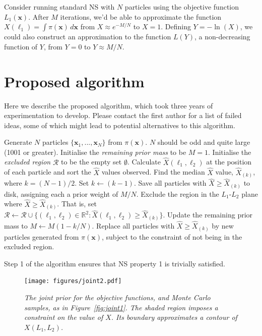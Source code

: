 \documentclass[journal,article,accept,moreauthors,pdftex,12pt,a4paper]{mdpi}
\newcommand{\xx}{\boldsymbol{x}}
\begin{document}
Consider running standard NS with $N$ particles
using the objective function $L_1(\xx)$.
After $M$ iterations, we'd be able to approximate
the function $X(\ell_1) = \int \pi(\xx) \, d\xx$
from $X\approx e^{-M/N}$ to $X=1$. Defining $Y=-\ln(X)$, we could also
construct an approximation to the function
$L(Y)$, a non-decreasing function of $Y$, from $Y=0$ to $Y\approx M/N$.

\section{Proposed algorithm}\label{sec:algorithm}

Here we describe the proposed algorithm, which took three years of
experimentation to develop. Please contact the first author for a list of
failed ideas, some of which might lead to potential alternatives to this
algorithm. 

\begin{algorithm}
\begin{algorithmic}
\State Generate $N$ particles $\{\xx_1, ..., \xx_N\}$ from $\pi(\xx)$.
$N$ should be odd and quite large (1001 or greater).
\State Initialise the {\em remaining prior mass} to be $M=1$.
\State Initialise the {\em excluded region} $\mathcal{R}$ to be the empty set
$\emptyset$.
	\State Calculate $\hat{X}(\ell_1, \ell_2)$ at the position of each particle
			and sort the $\hat{X}$ values observed.
	\State Find the median $\hat{X}$ value, $\hat{X}_{(k)}$, where $k = (N-1)/2$.
		\State Set $k \leftarrow (k-1)$.
	\EndWhile
	\State Save all particles with $\hat{X} \geq \hat{X}_{(k)}$ to disk,
			assigning each a prior weight of $M/N$.
	\State Exclude the region in the $L_1$-$L_2$ plane where
$\hat{X} \geq \hat{X}_{(k)}$. That is, set
	\State \hspace{20pt} $\mathcal{R} \leftarrow \mathcal{R} \cup \{(\ell_1, \ell_2) \in \mathbb{R}^2: \hat{X}(\ell_1, \ell_2) \geq \hat{X}_{(k)}\}$.
	\State Update the remaining prior mass to $M \leftarrow M(1 - k/N)$.
	\State Replace all particles with $\hat{X} \geq \hat{X}_{(k)}$ by new
			particles generated from $\pi(\xx)$, subject to the constraint
			of not being in the excluded region.
\EndWhile
\end{algorithmic}
\end{algorithm}

Step 1 of the algorithm ensures that NS property 1 is trivially satisfied.


\begin{figure}
\centering
\texttt{[image: figures/joint2.pdf]}
\caption{\it The joint prior for the objective functions, and Monte Carlo
samples, as in Figure~\ref{fig:joint1}. The shaded region imposes a
constraint on the value of $\hat{X}$. Its boundary approximates a contour
of $X(L_1, L_2)$.
\label{fig:joint2}}
\end{figure}
\end{document}
